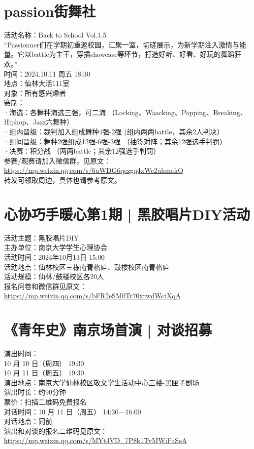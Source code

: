 \documentclass[letterpaper, 12pt]{article}
\begin{document}
\begin{multicols}{2}
\section{passion街舞社}
活动名称：Back to School Vol.1.5\\
“Passionner们在学期初重返校园，汇聚一室，切磋展示，为新学期注入激情与能量。它以battle为主干，穿插showcase等环节，打造好听、好看、好玩的舞蹈狂欢。”\\
时间：2024.10.11 周五 18:30\\
地点：仙林大活111室\\
对象：所有感兴趣者\\
赛制：\\
·海选：各舞种海选三强，可二海 （Locking、Waacking、Popping、Breaking、Hiphop、Jazz六舞种）\\
·组内晋级：裁判加入组成舞种4强-2强  (组内两两battle，其余2人判决）\\
·组间晋级：舞种2强组成12强-6强-3强 （抽签对阵；其余12强选手判罚）\\
·决赛：积分战 （两两battle；其余12强选手判罚）\\
参赛/观赛请加入微信群，见原文：\url{https://mp.weixin.qq.com/s/6uWDG6qczgq4xWc2uhmakQ}\\
转发可领取周边，具体也请参考原文。


\section{心协巧手暖心第1期 | 黑胶唱片DIY活动}
活动主题：黑胶唱片DIY\\
主办单位：南京大学学生心理协会\\
活动时间：2024年10月13日 15:00\\
活动地点：仙林校区三栋南青格庐、鼓楼校区南青格庐\\
活动规模：仙林/鼓楼校区各20人\\
报名问卷和微信群见原文：\url{https://mp.weixin.qq.com/s/bFR2eSM0Tr70xrwdWctXqA}

\section{《青年史》南京场首演 | 对谈招募}
演出时间：\\
10 月 10 日（周四） 19:30\\
10 月 11 日（周五） 19:30\\
演出地点：南京大学仙林校区敬文学生活动中心三楼-黑匣子剧场\\
演出时长：约90分钟\\
票价：扫描二维码免费报名\\
对话时间：10 月 11 日（周五） 14:30—16:00\\
对话地点：同前\\
演出和对谈的报名二维码见原文：\url{https://mp.weixin.qq.com/s/MYt4VD_7P8k1TvMWiFuSeA}


\end{multicols}
\end{document}
